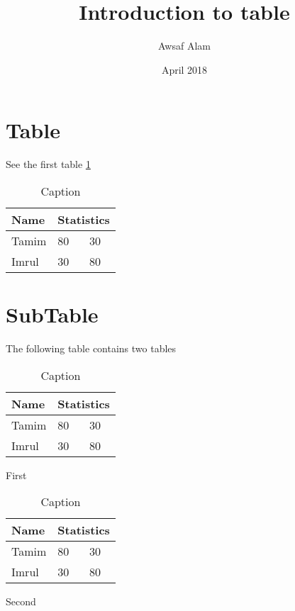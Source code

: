 \documentclass{article}
\title{Introduction to table}
\author{Awsaf Alam }
\date{April 2018}
\begin{document}
\maketitle

\listoftables

\section{Table}
See the first table \ref{tab:table}
\begin{table}[h!]
    \centering
    \begin{tabular}{|m{2cm}|m{2cm}|m{3cm}|}
    \hline
    Name & 
    \multicolumn{2}{c|}{Statistics} \\
    \hline
    \hline
    Tamim & 80  & 30\\
    \hline
    Imrul & 30 & 80\\
    \hline
    
    \end{tabular}
    \caption{Caption}
    \label{tab:table}
\end{table}

\section{SubTable}

The following table contains two tables
\begin{table}[h!]
  \begin{subtable}{0.45\textwidth}
        \begin{tabular}{|m{2cm}|m{2cm}|m{3cm}|}
        \hline
            Name & 
            \multicolumn{2}{c|}{Statistics} \\
            \hline
            \hline
            Tamim & 80  & 30\\
            \hline
            Imrul & 30 & 80\\
            \hline
            
        \end{tabular}
    \caption{First}
    \label{subtab:1}
    \end{subtable}
   
   
   \begin{subtable}{0.45\textwidth}
        \begin{tabular}{|m{2cm}|m{2cm}|m{3cm}|}
        \hline
            Name & 
            \multicolumn{2}{c|}{Statistics} \\
            \hline
            \hline
            Tamim & 80  & 30\\
            \hline
            Imrul & 30 & 80\\
            \hline
            
        \end{tabular}
    \caption{Second}
    \label{subtab:2}
    
    \end{subtable}
    
    \caption{Caption}
\end{table}
\end{document}
